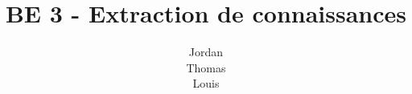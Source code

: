 \documentclass[a4paper, 11pt]{report}
\begin{document}
	\title{BE 3 - Extraction de connaissances}
	\author{Jordan \\ Thomas \\ Louis }

	\maketitle

	\paragraph{}
		\lipsum[1-3]
\end{document}
